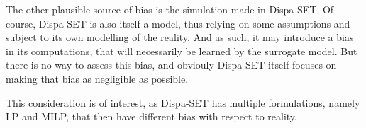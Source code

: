 The other plausible source of bias is the simulation made in Dispa-SET. Of course, Dispa-SET is also itself a model, thus relying on some assumptions and subject to its own modelling of the reality. And as such, it may introduce a bias in its computations, that will necessarily be learned by the surrogate model. But there is no way to assess this bias, and obviouly Dispa-SET itself focuses on making that bias as negligible as possible.

This consideration is of interest, as Dispa-SET has multiple formulations, namely LP and MILP, that then have different bias with respect to reality.

\subsection{}